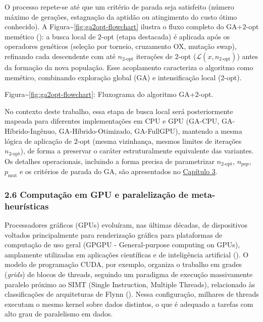 O processo repete-se até que um critério de parada seja satisfeito
(número máximo de gerações, estagnação da aptidão ou atingimento do
custo ótimo conhecido). A
Figura\textasciitilde{}\ref{fig:ga2opt-flowchart} ilustra o fluxo
completo do GA+\(2\)-opt memético
(): a busca local de \(2\)-opt
(etapa destacada) é aplicada após os operadores genéticos (seleção por
torneio, cruzamento OX, mutação swap), refinando cada descendente com
até \(n_{2\text{-opt}}\) iterações de \(2\)-opt
(\(\mathcal{L}(x, n_{2\text{-opt}})\)) antes da formação da nova
população. Esse acoplamento caracteriza o algoritmo como memético,
combinando exploração global (GA) e intensificação local (\(2\)-opt).

Figura\textasciitilde{}\ref{fig:ga2opt-flowchart}: Fluxograma do
algoritmo GA+\(2\)-opt.

No contexto deste trabalho, essa etapa de busca local será
posteriormente mapeada para diferentes implementações em CPU e GPU
(GA-CPU, GA-Híbrido-Ingênuo, GA-Híbrido-Otimizado, GA-FullGPU), mantendo
a mesma lógica de aplicação de \(2\)-opt (mesma vizinhança, mesmos
limites de iterações \(n_{2\text{-opt}}\)), de forma a preservar o
caráter estruturalmente equivalente das variantes. Os detalhes
operacionais, incluindo a forma precisa de parametrizar
\(n_{2\text{-opt}}\), \(n_{pop}\), \(p_{\text{mut}}\) e os critérios de
parada do GA, são apresentados no
\hyperref[cap3-materiais-metodos]{Capítulo 3}.

\subsubsection{2.6 Computação em GPU e paralelização de
meta-heurísticas}\label{sec-26-gpu-metaheuristicas}

Processadores gráficos (GPUs) evoluíram, nas últimas décadas, de
dispositivos voltados principalmente para renderização gráfica para
plataformas de computação de uso geral (GPGPU - General-purpose
computing on GPUs), amplamente utilizadas em aplicações científicas e de
inteligência artificial (). O modelo de
programação CUDA, por exemplo, organiza o trabalho em grades
(\emph{grids}) de blocos de threads, seguindo um paradigma de execução
massivamente paralelo próximo ao SIMT (Single Instruction, Multiple
Threads), relacionado às classificações de arquiteturas de Flynn
(). Nessa configuração, milhares de
threads executam o mesmo kernel sobre dados distintos, o que é adequado
a tarefas com alto grau de paralelismo em dados.

